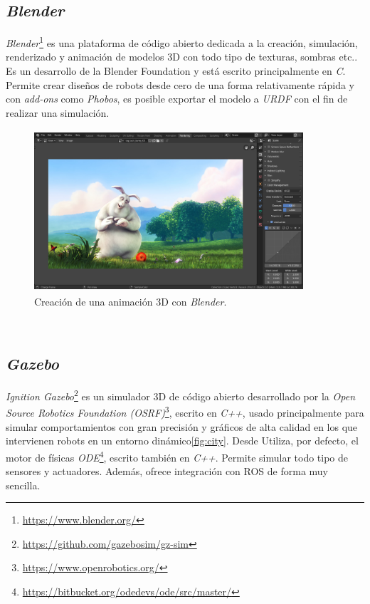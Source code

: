 \subsection{\textit{Blender}}
\label{subsection:blender}
\textit{Blender}\footnote{\url{https://www.blender.org/}} es una plataforma de código abierto dedicada a la creación, simulación, renderizado y animación de modelos 3D con todo tipo de texturas, sombras etc.. Es un desarrollo de la Blender Foundation y está escrito principalmente en \textit{C}. Permite crear diseños de robots desde cero de una forma relativamente rápida y con \textit{add-ons} como \textit{Phobos}, es posible exportar el modelo a \textit{URDF} con el fin de realizar una simulación\cite{phobos}.\\

\begin{figure} [h!]
	\begin{center}
		\includegraphics[width=10cm, height=6cm]{figs/blender}
	\end{center}
	\caption{Creación de una animación 3D con \textit{Blender}.}
	\label{fig:blender}
\end{figure}\

\subsection{\textit{Gazebo}}
\label{subsection:gazebo}
\textit{Ignition Gazebo}\footnote{\url{https://github.com/gazebosim/gz-sim}} es un simulador 3D de código abierto desarrollado por la \textit{Open Source Robotics Foundation (OSRF)}\footnote{\url{https://www.openrobotics.org/}}, escrito en \textit{C++}, usado principalmente para simular comportamientos con gran precisión y gráficos de alta calidad en los que intervienen robots en un entorno dinámico\ref{fig:city}. Desde  Utiliza, por defecto, el motor de físicas \textit{ODE}\footnote{\url{https://bitbucket.org/odedevs/ode/src/master/}}, escrito también en \textit{C++}. Permite simular todo tipo de sensores y actuadores. Además, ofrece integración con ROS de forma muy sencilla.\\

